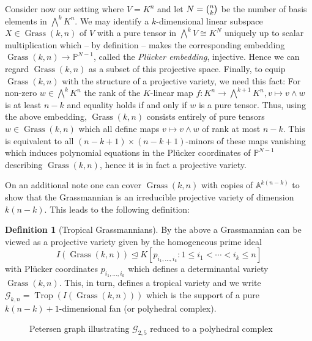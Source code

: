 \documentclass[
  paper=a4,
  titlepage,
  bibliography=totoc,
  pagesize=pdftex
]{scrartcl}
\numberwithin{figure}{section}
\numberwithin{equation}{section}
\numberwithin{table}{section}
\newcommand*\setA{\mathds{A}}
\newcommand*\setP{\mathds{P}}
\let\idealof\trianglelefteq
\DeclareMathOperator{\Trop}{Trop}
\DeclareMathOperator{\Grass}{Grass}
\theoremstyle{definition}
\newtheorem{definition}{Definition}
\numberwithin{definition}{section}
\begin{document}
Consider now our setting where $V=K^n$ and let $N = \smash{\binom nk}$ be the number of
basis elements in $\bigwedge^kK^n$. We may identify a $k$-dimensional linear subspace $X
\in \Grass(k,n)$ of $V$ with a pure tensor in $\bigwedge^kV \cong K^N$ uniquely up to
scalar multiplication which -- by definition -- makes the corresponding embedding
$\Grass(k,n) \to \setP^{N-1}$, called the \emph{Plücker embedding}, injective. Hence we
can regard $\Grass(k,n)$ as a subset of this projective space. Finally, to equip
$\Grass(k,n)$ with the structure of a projective variety, we need this fact: For non-zero
$w\in \bigwedge^kK^n$ the rank of the $K$-linear map $f:K^n \to \bigwedge^{k+1}K^n, v
\mapsto v \wedge w$ is at least $n-k$ and equality holds if and only if $w$ is a pure
tensor. Thus, using the above embedding, $\Grass(k,n)$ consists entirely of pure tensors
$w\in \Grass(k,n)$ which all define maps $v\mapsto v\wedge w$ of rank at most $n-k$. This
is equivalent to all $(n-k+1) \times (n-k+1)$-minors of these maps vanishing which induces
polynomial equations in the Plücker coordinates of $\setP^{N-1}$ describing $\Grass(k,n)$,
hence it is in fact a projective variety.

On an additional note one can cover $\Grass(k,n)$ with copies of $\setA^{k(n-k)}$ to show
that the Grassmannian is an irreducible projective variety of dimension $k(n-k)$. This
leads to the following definition:

\begin{definition}[Tropical Grassmannians]
  By the above a Grassmannian can be viewed as a projective variety given by the
  homogeneous prime ideal
  \[
    I(\Grass(k,n)) \idealof K[ p_{i_1, \dots, i_k} : 1\leq i_1 < \cdots < i_k \leq n ]
  \]
  with Plücker coordinates $p_{i_1,\dots,i_k}$ which defines a determinantal variety
  $\Grass(k, n)$. This, in turn, defines a tropical variety and we write $\mathcal G_{k,n}
  = \Trop(I(\Grass(k,n)))$ which is the support of a pure $k(n-k)+1$-dimensional fan (or
  polyhedral complex).
\end{definition}

\begin{figure}[tbhp]
  \centering
  \caption{Petersen graph illustrating $\mathcal G_{2,5}$ reduced to a polyhedral complex}
  \label{fig:petersen}
\end{figure}
\end{document}
